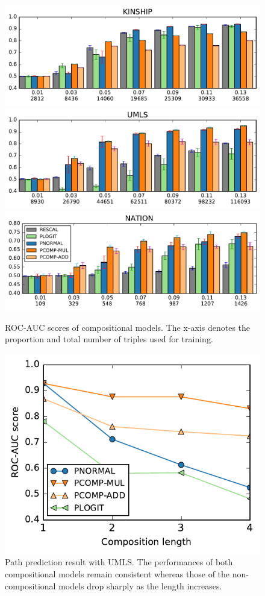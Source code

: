 \begin{figure}[t]
	\centering
	\includegraphics[width=\linewidth]{images/comp_training_error_kinship_small.pdf}
	\includegraphics[width=\linewidth]{images/comp_training_error_umls_small.pdf}			
	\includegraphics[width=\linewidth]{images/comp_training_error_nation_small.pdf}				
	\caption{\label{fig:r_vs_br} ROC-AUC scores of compositional models. 
	The x-axis denotes the proportion and total number of triples used for training. %
}
\end{figure} 

\begin{figure}[t]
	\centering
	\includegraphics[width=0.7\linewidth]{images/path_prediction2.pdf}
	\caption{\label{fig:path_pred} Path prediction result with UMLS. 
	The performances of both compositional models remain consistent 
	whereas those of the non-compositional models drop sharply as the length increases.}
\end{figure}

